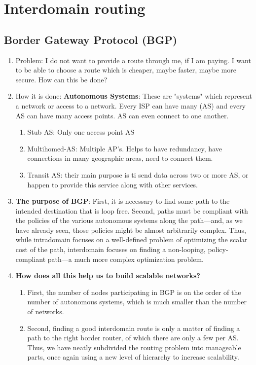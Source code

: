 \documentclass[12pt]{book}
\begin{document}
\section{Interdomain routing}
\subsection{Border Gateway Protocol (BGP)}
\begin{enumerate}
    \item Problem: I do not want to provide a route through me, if I am paying. I want to be able to choose a route which is cheaper, maybe faster, maybe more secure. How can this be done?
    \item How it is done:
    \textbf{Autonomous Systems}: These are "systems" which represent a network or access to a network. Every ISP can have many (AS) and every AS can have many access points. AS can even connect to one another.
    \begin{enumerate}
        \item Stub AS: Only one access point AS
        \item Multihomed-AS: Multiple AP's. Helps to have redundancy, have connections in many geographic areas, need to connect them.
        \item Transit AS: their main purpose is ti send data across two or more AS, or happen to provide this service along with other services.
    \end{enumerate}
    \item \textbf{The purpose of BGP}: First, it is necessary to find some path to the intended destination that is loop free. Second, paths must be compliant with the policies of the various autonomous systems along the path—and, as we have already seen, those policies might be almost arbitrarily complex. Thus, while intradomain focuses on a well-defined problem of optimizing the scalar cost of the path, interdomain focuses on finding a non-looping, policy-compliant path—a much more complex optimization problem.
    \item \textbf{How does all this help us to build scalable networks?}
    \begin{enumerate}
        \item First, the number of nodes participating in BGP is on the order of the number of autonomous systems, which is much smaller than the number of networks.
        \item Second, finding a good interdomain route is only a matter of finding a path to the right border router, of which there are only a few per AS. Thus, we have neatly subdivided the routing problem into manageable parts, once again using a new level of hierarchy to increase scalability.

\end{enumerate}
\end{enumerate}
\end{document}
